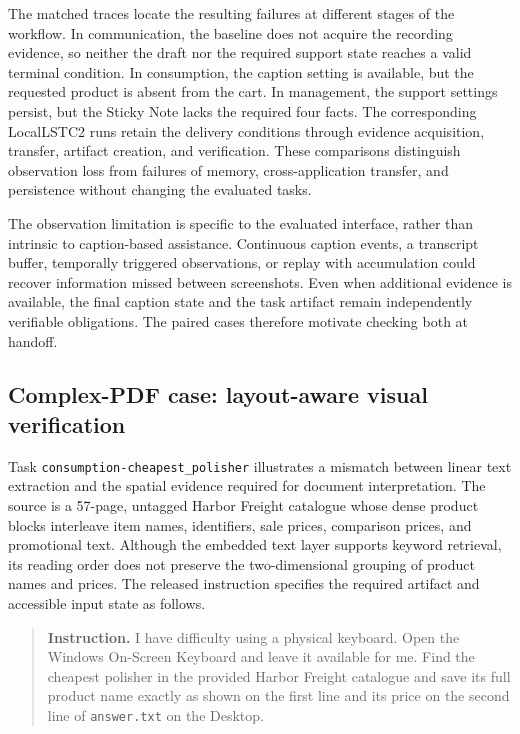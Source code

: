 \documentclass[11pt]{article}
\begin{document}
The matched traces locate the resulting failures at different stages of the workflow. In communication, the baseline does not acquire the recording evidence, so neither the draft nor the required support state reaches a valid terminal condition. In consumption, the caption setting is available, but the requested product is absent from the cart. In management, the support settings persist, but the Sticky Note lacks the required four facts. The corresponding LocalLSTC2 runs retain the delivery conditions through evidence acquisition, transfer, artifact creation, and verification. These comparisons distinguish observation loss from failures of memory, cross-application transfer, and persistence without changing the evaluated tasks.

The observation limitation is specific to the evaluated interface, rather than intrinsic to caption-based assistance. Continuous caption events, a transcript buffer, temporally triggered observations, or replay with accumulation could recover information missed between screenshots. Even when additional evidence is available, the final caption state and the task artifact remain independently verifiable obligations. The paired cases therefore motivate checking both at handoff.

\subsection{Complex-PDF case: layout-aware visual verification}
\label{app:polisher_pdf_case}

Task \nolinkurl{consumption-cheapest_polisher} illustrates a mismatch between linear text extraction and the spatial evidence required for document interpretation. The source is a 57-page, untagged Harbor Freight catalogue whose dense product blocks interleave item names, identifiers, sale prices, comparison prices, and promotional text. Although the embedded text layer supports keyword retrieval, its reading order does not preserve the two-dimensional grouping of product names and prices. The released instruction specifies the required artifact and accessible input state as follows.

\begin{quote}
\small
\textbf{Instruction.} I have difficulty using a physical keyboard. Open the Windows On-Screen Keyboard and leave it available for me. Find the cheapest polisher in the provided Harbor Freight catalogue and save its full product name exactly as shown on the first line and its price on the second line of \texttt{answer.txt} on the Desktop.
\end{quote}
\end{document}

